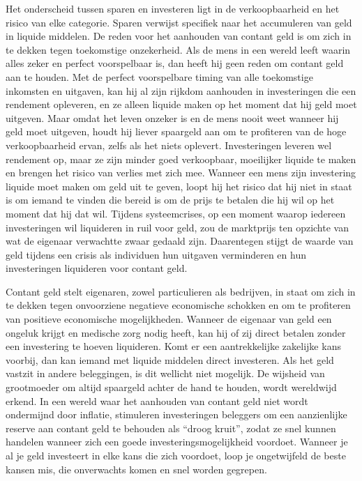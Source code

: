 Het onderscheid tussen sparen en investeren ligt in de verkoopbaarheid en het risico van elke categorie. Sparen verwijst specifiek naar het accumuleren van geld in liquide middelen. De reden voor het aanhouden van contant geld is om zich in te dekken tegen toekomstige onzekerheid. Als de mens in een wereld leeft waarin alles zeker en perfect voorspelbaar is, dan heeft hij geen reden om contant geld aan te houden. Met de perfect voorspelbare timing van alle toekomstige inkomsten en uitgaven, kan hij al zijn rijkdom aanhouden in investeringen die een rendement opleveren, en ze alleen liquide maken op het moment dat hij geld moet uitgeven. Maar omdat het leven onzeker is en de mens nooit weet wanneer hij geld moet uitgeven, houdt hij liever spaargeld aan om te profiteren van de hoge verkoopbaarheid ervan, zelfs als het niets oplevert. Investeringen leveren wel rendement op, maar ze zijn minder goed verkoopbaar, moeilijker liquide te maken en brengen het risico van verlies met zich mee. Wanneer een mens zijn investering liquide moet maken om geld uit te geven, loopt hij het risico dat hij niet in staat is om iemand te vinden die bereid is om de prijs te betalen die hij wil op het moment dat hij dat wil. Tijdens systeemcrises, op een moment waarop iedereen investeringen wil liquideren in ruil voor geld, zou de marktprijs ten opzichte van wat de eigenaar verwachtte zwaar gedaald zijn. Daarentegen stijgt de waarde van geld tijdens een crisis als individuen hun uitgaven verminderen en hun investeringen liquideren voor contant geld.

Contant geld stelt eigenaren, zowel particulieren als bedrijven, in staat om zich in te dekken tegen onvoorziene negatieve economische schokken en om te profiteren van positieve economische mogelijkheden. Wanneer de eigenaar van geld een ongeluk krijgt en medische zorg nodig heeft, kan hij of zij direct betalen zonder een investering te hoeven liquideren. Komt er een aantrekkelijke zakelijke kans voorbij, dan kan iemand met liquide middelen direct investeren. Als het geld vastzit in andere beleggingen, is dit wellicht niet mogelijk. De wijsheid van grootmoeder om altijd spaargeld achter de hand te houden, wordt wereldwijd erkend. In een wereld waar het aanhouden van contant geld niet wordt ondermijnd door inflatie, stimuleren investeringen beleggers om een aanzienlijke reserve aan contant geld te behouden als ``droog kruit'', zodat ze snel kunnen handelen wanneer zich een goede investeringsmogelijkheid voordoet. Wanneer je al je geld investeert in elke kans die zich voordoet, loop je ongetwijfeld de beste kansen mis, die onverwachts komen en snel worden gegrepen.

